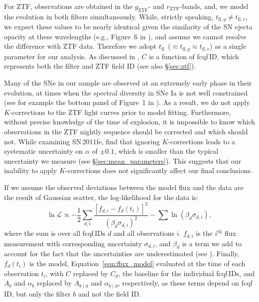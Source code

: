 \documentclass[twocolumn]{./aastex63}
\newcommand{\rztf}{$r_\mathrm{ZTF}$}
\newcommand{\gztf}{$g_\mathrm{ZTF}$}
\newcommand{\tfl}{$t_\mathrm{fl}$}
\begin{document}
For ZTF, observations are obtained in the \gztf- and \rztf-bands, and, we
model the evolution in both filters simultaneously. While, strictly speaking,
$t_{\mathrm{fl}, g} \ne t_{\mathrm{fl}, r}$, we expect these values to be
nearly identical given the similarity of the SN ejecta opacity at these
wavelengths (e.g., Figure~6 in \citealt{Magee18}), and assume we cannot
resolve the difference with ZTF data. Therefore we adopt \tfl\ ($\approx
t_{\mathrm{fl}, g} \approx t_{\mathrm{fl}, r}$) as a single parameter for our
analysis. As discussed in \citet{Yao19}, $C$ is a function of fcqf\,ID, which
represents both the filter and ZTF field ID (see also \S\ref{sec:ztf}).

Many of the SNe in our sample are observed at an extremely early phase in
their evolution, at times when the spectral diversity in SNe Ia is not well
constrained (see for example the bottom panel of Figure~1 in \citealt{Guy07}).
As a result, we do not apply $K$-corrections to the ZTF light curves prior to
model fitting. Furthermore, without precise knowledge of the time of
explosion, it is impossible to know which observations in the ZTF nightly
sequence should be corrected and which should not. While examining SN\,2011fe,
\citet{Firth15} find that ignoring $K$-corrections leads to a systematic
uncertainty on $\alpha$ of $\pm0.1$, which is smaller than the typical
uncertainty we measure (see \S\ref{sec:mean_parameters}). This suggests that
our inability to apply $K$-corrections does not significantly affect our final
conclusions.

If we assume the observed deviations between the model flux and the data are
the result of Gaussian scatter, the log-likelihood for the data is:
%
\begin{equation}
    \ln \mathscr{L} \propto -\frac{1}{2}\sum_{d,i} \frac{[f_{d,i} - f_d(t_i)]^2}{(\beta_d \sigma_{d,i})^2} -\sum{\ln (\beta_d \sigma_{d,i})},
\end{equation}
%
where the sum is over all fcqf\,IDs $d$ and all observations $i$. $f_{d,i}$
is the $i^\mathrm{th}$ flux measurement with corresponding uncertainty
$\sigma_{d,i}$, and $\beta_d$ is a term we add to account for the fact that
the uncertainties are underestimated (see \citealt{Yao19}). Finally,
$f_d(t_i)$ is the model, Equation~\ref{eqn:flux_model} evaluated at the time
of each observation $t_i$, with $C$ replaced by $C_d$, the baseline for the
individual fcqf\,IDs, and $A_b$ and $\alpha_b$ replaced by $A_{b\mid d}$ and
$\alpha_{b\mid d}$, respectively, as these terms depend on fcqf\,ID, but
only the filter $b$ and not the field ID.
\end{document}
